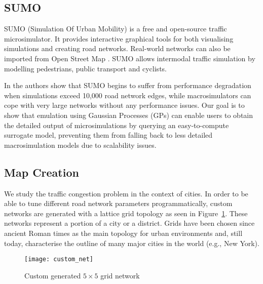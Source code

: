 \subsection{SUMO}
\label{sec:sumo}

SUMO (Simulation Of Urban Mobility) is a free and open-source traffic microsimulator. It provides interactive graphical tools for both visualising simulations and creating road networks. Real-world networks can also be imported from Open Street Map \cite{haklay2008openstreetmap}. SUMO allows intermodal traffic simulation by modelling pedestrians, public transport and cyclists.

In \cite{kotusevski2009review} the authors show that SUMO begins to suffer from performance degradation when simulations exceed 10,000 road network edges, while macrosimulators can cope with very large networks without any performance issues. Our goal is to show that emulation using Gaussian Processes (GPs) can enable users to obtain the detailed output of microsimulations by querying an easy-to-compute surrogate model, preventing them from falling back to less detailed macrosimulation models due to scalability issues.

\subsection{Map Creation}
\label{sec:map_creation}

We study the traffic congestion problem in the context of cities. In order to be able to tune different road network parameters programmatically, custom networks are generated with a lattice grid topology as seen in Figure~\ref{fig:custom_network}. These networks represent a portion of a city or a district. Grids have been chosen since ancient Roman times as the main topology for urban environments and, still today, characterise the outline of many major cities in the world (e.g., New York).

\begin{figure}[b!]
    \centering
    \texttt{[image: custom\_net]}
    \caption{Custom generated $5\times5$ grid network}
    \label{fig:custom_network}
\end{figure}


